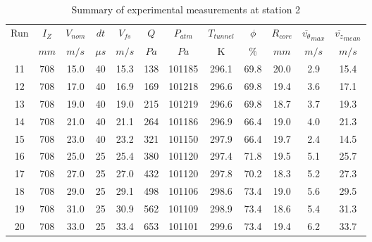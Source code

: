 \begin{table}[H]
\begin{center}
\begin{tabular}{|cccccccccccc|}
	\hline
	Run & $I_Z$ & $V_{nom}$ & $dt$ & $V_{fs}$ & $Q$ & $P_{atm}$ & $T_{tunnel}$ & $\phi$ & $R_{core}$ & $\overline{v_{\theta}}_{max}$ & $\overline{v_{z}}_{mean}$\\
	  & $mm$ & $m/s$ & $\mu s$ & $m/s$ & $Pa$ & $Pa$ & K & $\%$ & $mm$ & $m/s$ & $m/s$\\
	\hline
	11 & 708 & 15.0 & 40 & 15.3 & 138 & 101185 & 296.1 & 69.8 & 20.0 & 2.9 & 15.4\\
	12 & 708 & 17.0 & 40 & 16.9 & 169 & 101218 & 296.6 & 69.8 & 19.4 & 3.6 & 17.1\\
	13 & 708 & 19.0 & 40 & 19.0 & 215 & 101219 & 296.6 & 69.8 & 18.7 & 3.7 & 19.3\\
	14 & 708 & 21.0 & 40 & 21.1 & 264 & 101186 & 296.9 & 66.4 & 19.0 & 4.0 & 21.3\\
	15 & 708 & 23.0 & 40 & 23.2 & 321 & 101150 & 297.9 & 66.4 & 19.7 & 2.4 & 14.5\\
	16 & 708 & 25.0 & 25 & 25.4 & 380 & 101120 & 297.4 & 71.8 & 19.5 & 5.1 & 25.7\\
	17 & 708 & 27.0 & 25 & 27.0 & 432 & 101120 & 297.8 & 70.2 & 18.3 & 5.2 & 27.3\\
	18 & 708 & 29.0 & 25 & 29.1 & 498 & 101106 & 298.6 & 73.4 & 19.0 & 5.6 & 29.5\\
	19 & 708 & 31.0 & 25 & 30.9 & 562 & 101109 & 298.9 & 73.4 & 18.6 & 5.4 & 31.3\\
	20 & 708 & 33.0 & 25 & 33.4 & 653 & 101101 & 299.6 & 73.4 & 19.4 & 6.2 & 33.7\\
	\hline
\end{tabular}
\caption{Summary of experimental measurements at station 2}
\label{table:experiment_results_2}
\end{center}
\end{table}
